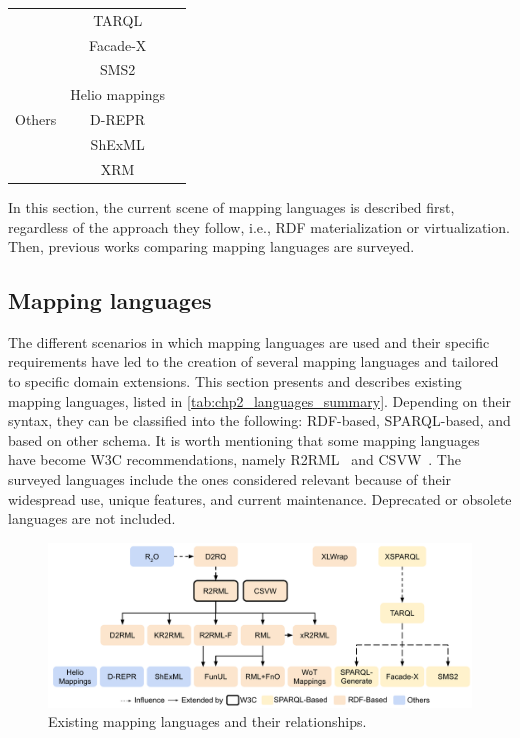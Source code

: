 \begin{table}[t]
\begin{tabular}{c|c|c}
                              & TARQL           & \cite{tarql}\\ \cline{2-3}
                              & Facade-X        & \cite{daga2021facade,sparqlanything}\\ \cline{2-3}
                              & SMS2            & \cite{sms2}\\ \hline
\multirow{3}{*}{Others}       & Helio mappings  & \cite{cimmino2022helio}\\ \cline{2-3} 
                              & D-REPR          & \cite{Vu2019d-repr}\\ \cline{2-3} 
                              & ShExML          & \cite{Garcia-Gonzalez2020shexml,shexml}\\ \cline{2-3}
                              & XRM             & \cite{xrm}\\ \hline
\end{tabular}
\end{table}

In this section, the current scene of mapping languages is described first, regardless of the approach they follow, i.e., RDF materialization or virtualization. Then, previous works comparing mapping languages are surveyed. 








\subsection{Mapping languages}
The different scenarios in which mapping languages are used and their specific requirements have led to the creation of several mapping languages and tailored to specific domain extensions. This section presents and describes existing mapping languages, listed in \cref{tab:chp2_languages_summary}. Depending on their syntax, they can be classified into the following: RDF-based, SPARQL-based, and based on other schema. It is worth mentioning that some mapping languages have become W3C recommendations, namely R2RML~\cite{das2012r2rml} and CSVW~\cite{Tennison2015csvw}. The surveyed languages include the ones considered relevant because of their widespread use, unique features, and current maintenance. Deprecated or obsolete languages are not included.

\begin{figure}[]
\centering
\includegraphics[width=0.95\linewidth]{figures/mapping_languages}
\caption{Existing mapping languages and their relationships.}
\label{fig:mapping_languages}
\end{figure}

